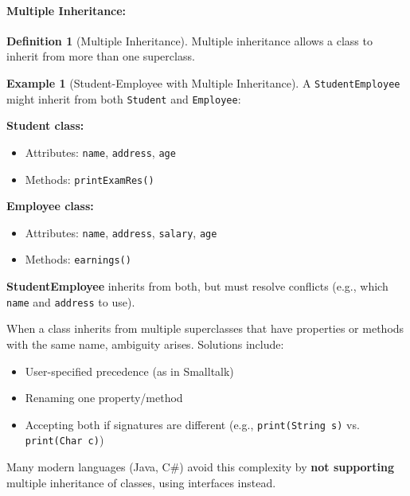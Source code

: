 \documentclass[11pt, a4paper, notitlepage]{report}
\theoremstyle{definition}
\newtheorem{definition}[theorem]{Definition}
\theoremstyle{remark}
\theoremstyle{definition}
\newtheorem{example}[theorem]{Example}
\begin{document}
\paragraph{Multiple Inheritance:}

\begin{definition}[Multiple Inheritance]
\label{def:ch1-multiple-inheritance}
Multiple inheritance allows a class to inherit from more than one superclass.
\end{definition}

\begin{example}[Student-Employee with Multiple Inheritance]
\label{ex:ch1-multiple-inheritance}
A \texttt{StudentEmployee} might inherit from both \texttt{Student} and \texttt{Employee}:

\textbf{Student class:}
\begin{itemize}
  \item Attributes: \texttt{name}, \texttt{address}, \texttt{age}
  \item Methods: \texttt{printExamRes()}
\end{itemize}

\textbf{Employee class:}
\begin{itemize}
  \item Attributes: \texttt{name}, \texttt{address}, \texttt{salary}, \texttt{age}
  \item Methods: \texttt{earnings()}
\end{itemize}

\textbf{StudentEmployee} inherits from both, but must resolve conflicts (e.g., which \texttt{name} and \texttt{address} to use).
\end{example}

\begin{warning}[title={Problems with Multiple Inheritance}]
When a class inherits from multiple superclasses that have properties or methods with the same name, ambiguity arises. Solutions include:
\begin{itemize}
  \item User-specified precedence (as in Smalltalk)
  \item Renaming one property/method
  \item Accepting both if signatures are different (e.g., \texttt{print(String s)} vs. \texttt{print(Char c)})
\end{itemize}

Many modern languages (Java, C\#) avoid this complexity by \textbf{not supporting} multiple inheritance of classes, using interfaces instead.
\end{warning}
\end{document}
